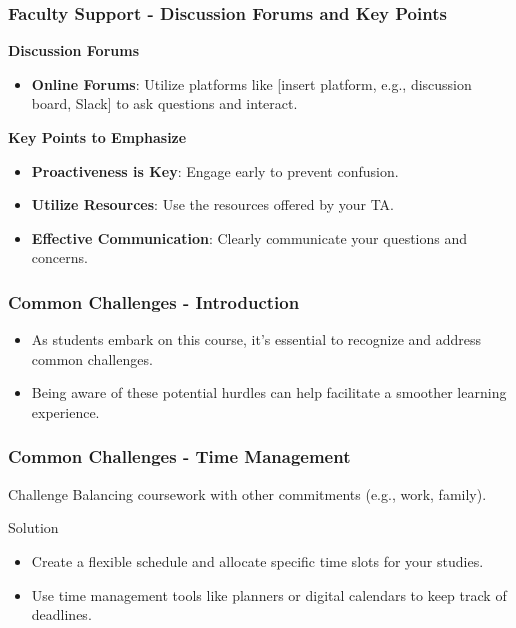 \documentclass[aspectratio=169]{beamer}
\begin{document}
\begin{frame}[fragile]
    \frametitle{Faculty Support - Discussion Forums and Key Points}

    \textbf{Discussion Forums}
    \begin{itemize}
        \item \textbf{Online Forums}: Utilize platforms like [insert platform, e.g., discussion board, Slack] to ask questions and interact.
    \end{itemize}
    
    \textbf{Key Points to Emphasize}
    \begin{itemize}
        \item \textbf{Proactiveness is Key}: Engage early to prevent confusion.
        
        \item \textbf{Utilize Resources}: Use the resources offered by your TA.
        
        \item \textbf{Effective Communication}: Clearly communicate your questions and concerns.
    \end{itemize}
    
\end{frame}

\begin{frame}[fragile]
    \frametitle{Common Challenges - Introduction}
    \begin{itemize}
        \item As students embark on this course, it's essential to recognize and address common challenges.
        \item Being aware of these potential hurdles can help facilitate a smoother learning experience.
    \end{itemize}
\end{frame}

\begin{frame}[fragile]
    \frametitle{Common Challenges - Time Management}
    \begin{block}{Challenge}
        Balancing coursework with other commitments (e.g., work, family).
    \end{block}
    \begin{block}{Solution}
        \begin{itemize}
            \item Create a flexible schedule and allocate specific time slots for your studies.
            \item Use time management tools like planners or digital calendars to keep track of deadlines.
        \end{itemize}
    \end{block}
\end{frame}
\end{document}
